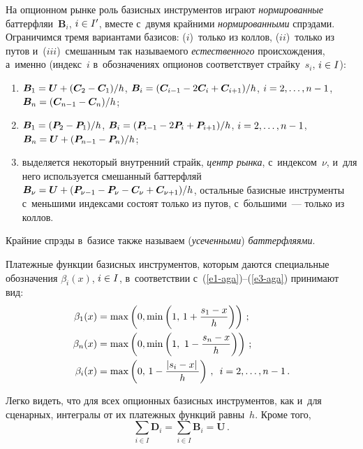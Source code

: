 \begin{multicols}{2}
  На опционном рынке роль базисных инструментов играют 
\textit{нормированные} баттерфляи~$\boldsymbol{B}_i$, $i\hm\in I^\prime$, 
вместе с~двумя крайними \textit{нормированными} спрэдами. Ограничимся 
тремя вариантами базисов: ($i$)~только из коллов, ($ii$)~только из путов 
и~($iii$)~смешанным так называемого \textit{естественного} происхождения, 
а~именно (индекс~$i$ в~обозначениях опционов соответствует страйку~$s_i$, 
$i\hm\in I$): 
  \begin{enumerate}[($i$)]
  \item  $\boldsymbol{B}_1 = \boldsymbol{U} + (\boldsymbol{C}_2 \hm- 
\boldsymbol{C}_1)/h$,  $\boldsymbol{B}_i \hm= (\boldsymbol{C}_{i-1}\hm- 
2\boldsymbol{C}_i \hm+ \boldsymbol{C}_{i+1})/h$, $i \hm= 2,\ldots , n-1$,  
$\boldsymbol{B}_n \hm= (\boldsymbol{C}_{n-1} \hm- \boldsymbol{C}_n)/h$; 
  \item  $\boldsymbol{B}_1 \hm= (\boldsymbol{P}_2 \hm- \boldsymbol{P}_1)/h$,   
$\boldsymbol{B}_i \hm= (\boldsymbol{P}_{i-1}\hm- 2\boldsymbol{P}_i \hm+ 
\boldsymbol{P}_{i+1})/h$,  $i \hm= 2,\ldots , n\hm-1$,  $\boldsymbol{B}_n \hm= 
\boldsymbol{U} \hm+ (\boldsymbol{P}_{n-1}\hm- \boldsymbol{P}_n)/h$; 
  \item  выделяется некоторый внутренний страйк, \textit{центр рынка}, 
с~индексом~$\nu$, и~для него используется смешанный баттерфляй 
$\boldsymbol{B}_\nu \hm= \boldsymbol{U} \hm+ (\boldsymbol{P}_{\nu-1}\hm- 
\boldsymbol{P}_\nu \hm - \boldsymbol{C}_\nu \hm+ \boldsymbol{C}_{\nu +1})/h$, 
остальные базисные инструменты с~меньшими индексами состоят только из 
путов, с~б$\acute{\mbox{о}}$льшими~--- только из коллов.
  \end{enumerate}
  
  Крайние спрэды в~базисе также называем (\textit{усеченными}) 
\textit{баттерфляями}.
  
  Платежные функции базисных инструментов, которым даются специальные 
обозначения $\beta_i(x)$, $i\hm\in I$, в~соответствии  
с~(\ref{e1-aga})--(\ref{e3-aga}) принимают вид:
  \begin{align*}
  \beta_1(x)&=\max \left( 0,\min\left( 1,\, 1+\fr{s_1-x}{h}\right)\right)\,;\\
  \beta_n(x)&=\max\left( 0, \min \left( 1,\ 1-\fr{s_n-x}{h}\right)\right)\,;\\
  \beta_i(x)&=\max \left( 0,\, 1-\fr{\left\vert s_i-x\right\vert}{h}\right)\,,\enskip 
i=2,\ldots , n-1\,.
  \end{align*}
  
  Легко видеть, что для всех опционных базисных инструментов, как и~для 
сценарных, интегралы от их платежных функций равны~$h$. Кроме того, 
  $$
  \sum\limits_{i\in I} \boldsymbol{D}_i=\sum\limits_{i\in I} \boldsymbol{B}_i 
=\boldsymbol{U}\,.
  $$
   

\end{multicols}

